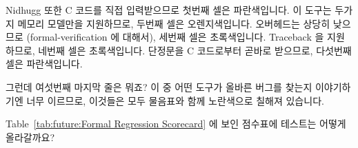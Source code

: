 Nidhugg 또한 C 코드를 직접 입력받으므로 첫번째 셀은 파란색입니다.
이 도구는 두가지 메모리 모델만을 지원하므로, 두번째 셀은 오렌지색입니다.
오버헤드는 상당히 낮으므로 (formal-verification 에 대해서), 세번째 셀은 초록색입니다.
Traceback 을 지원하므로, 네번째 셀은 초록색입니다.
단정문을 C 코드로부터 곧바로 받으므로, 다섯번째 셀은 파란색입니다.

그런데 여섯번째 마지막 줄은 뭐죠?
이 중 어떤 도구가 올바른 버그를 찾는지 이야기하기엔 너무 이르므로, 이것들은
모두 물음표와 함께 노란색으로 칠해져 있습니다.
\iffalse

The \co{cbmc} tool inputs C code directly, so its first cell is blue.
It supports a few memory models, so its second cell is yellow.
It has reasonable overhead, so its third cell is also yellow, however,
perhaps SAT-solver performance will continue improving.
It provides a traceback, so its fourth cell is green.
It takes assertions directly from the C code, so its fifth cell is blue.

Nidhugg also inputs C code directly, so its first cell is also blue.
It supports only a couple of memory models, so its second cell is orange.
Its overhead is quite low (for formal-verification), so its
third cell is green.
It provides a traceback, so its fourth cell is green.
It takes assertions directly from the C code, so its fifth cell is blue.

So what about the sixth and final row?
It is too early to tell how any of the tools do at finding the right bugs,
so they are all yellow with question marks.
\fi

\QuickQuiz{}
	Table~\ref{tab:future:Formal Regression Scorecard}
	에 보인 점수표에 테스트는 어떻게 올라갈까요?
	\iffalse

